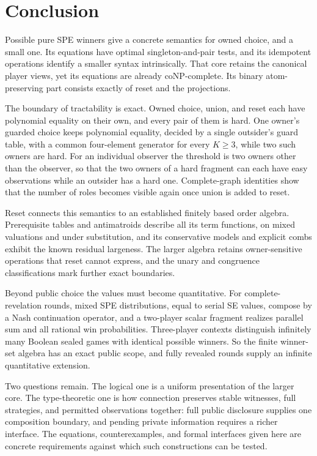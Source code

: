 \section{Conclusion}

Possible pure SPE winners give a concrete semantics for owned choice, and a small one. Its equations have optimal
singleton-and-pair tests, and its idempotent operations identify a smaller syntax intrinsically. That core retains the
canonical player views, yet its equations are already coNP-complete. Its binary atom-preserving part consists exactly of
reset and the projections.

The boundary of tractability is exact. Owned choice, union, and reset each have polynomial equality on their own, and every
pair of them is hard. One owner's guarded choice keeps polynomial equality, decided by a single outsider's guard table, with a
common four-element generator for every $K\geq3$, while two such owners are hard. For an individual observer the threshold is two
owners other than the observer, so that the two owners of a hard fragment can each have easy observations while an outsider has a
hard one. Complete-graph identities show that the number of roles becomes visible again once union is added to reset.

Reset connects this semantics to an established finitely based order algebra. Prerequisite tables and antimatroids describe all its
term functions, on mixed valuations and under substitution, and its conservative models and explicit combs exhibit the known residual
largeness. The larger algebra retains owner-sensitive operations that reset cannot express, and the unary and congruence classifications
mark further exact boundaries.

Beyond public choice the values must become quantitative. For complete-revelation rounds, mixed SPE distributions, equal to serial SE values,
compose by a Nash continuation operator, and a two-player scalar fragment realizes parallel sum and all rational win probabilities. Three-player
contexts distinguish infinitely many Boolean sealed games with identical possible winners. So the finite winner-set algebra has an exact public
scope, and fully revealed rounds supply an infinite quantitative extension.

Two questions remain. The logical one is a uniform presentation of the larger core. The type-theoretic one is how connection preserves stable
witnesses, full strategies, and permitted observations together: full public disclosure supplies one composition boundary, and pending private
information requires a richer interface. The equations, counterexamples, and formal interfaces given here are concrete requirements against which
such constructions can be tested.
